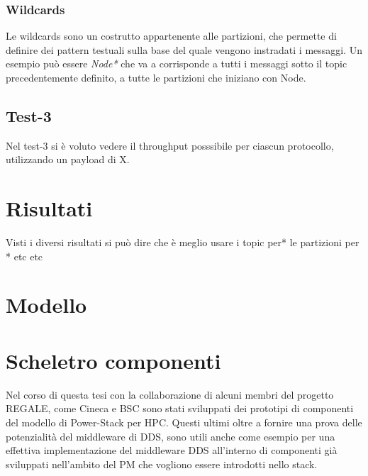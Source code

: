 \subsubsection{Wildcards}
Le wildcards sono un costrutto appartenente alle partizioni, che permette di definire dei pattern testuali sulla base del quale vengono instradati i messaggi. Un esempio può essere \textit{Node*} che va a corrisponde a tutti i messaggi sotto il topic precedentemente definito, a tutte le partizioni che iniziano con Node.

\begin{figure}[H]
    \centering
\end{figure}


\subsection{Test-3}
Nel test-3 si è voluto vedere il throughput posssibile per ciascun protocollo, utilizzando un payload di X.

\section{Risultati}
Visti i diversi risultati si può dire che è meglio usare i topic per* le partizioni per *
etc etc
\section{Modello}




\section{Scheletro componenti}
Nel corso di questa tesi con la collaborazione di alcuni membri del progetto REGALE, come Cineca\cite{TODO} e BSC\cite{TODO} sono stati sviluppati dei prototipi di componenti del modello di Power-Stack per HPC.
Questi ultimi oltre a fornire una prova delle potenzialità del middleware di DDS, sono utili anche come esempio per una effettiva implementazione del middleware DDS all'interno di componenti già sviluppati nell'ambito del PM che vogliono essere introdotti nello stack.


